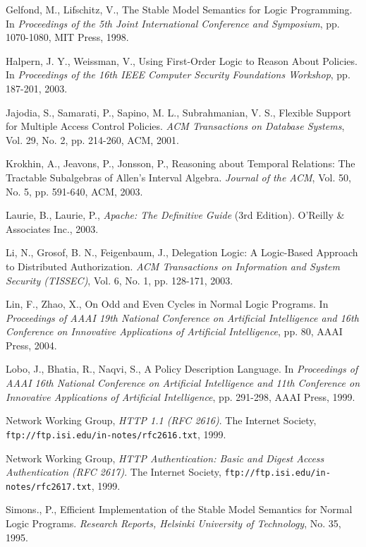 \documentclass[glov2,twocolumn,final]{svjour2}
\begin{document}
\begin{thebibliography}{5}
      Gelfond, M., Lifschitz, V.,
      The Stable Model Semantics for Logic Programming.
      In {\em Proceedings of the 5th Joint International Conference and
      Symposium},
      pp. 1070-1080, MIT Press, 1998.

      Halpern, J. Y., Weissman, V.,
      Using First-Order Logic to Reason About Policies.
      In {\em Proceedings of the 16th IEEE Computer Security Foundations
      Workshop}, pp. 187-201, 2003.

      Jajodia, S., Samarati, P., Sapino, M. L., Subrahmanian, V. S.,
      Flexible Support for Multiple Access Control Policies.
      {\em ACM Transactions on Database Systems},
      Vol. 29, No. 2, pp. 214-260, ACM, 2001.

      Krokhin, A., Jeavons, P., Jonsson, P.,
      Reasoning about Temporal Relations: The Tractable Subalgebras of
      Allen's Interval Algebra.
      {\em Journal of the ACM},
      Vol. 50, No. 5, pp. 591-640, ACM, 2003.

      Laurie, B., Laurie, P.,
      {\em Apache: The Definitive Guide} (3rd Edition).
      O'Reilly \& Associates Inc., 2003.

      Li, N., Grosof, B. N., Feigenbaum, J.,
      Delegation Logic: A Logic-Based Approach to Distributed Authorization.
      {\em ACM Transactions on Information and System Security (TISSEC)},
      Vol. 6, No. 1, pp. 128-171, 2003.

      Lin, F., Zhao, X.,
      On Odd and Even Cycles in Normal Logic Programs.
      In {\em Proceedings of AAAI 19th National Conference on Artificial
      Intelligence and 16th Conference on Innovative Applications of Artificial
      Intelligence},
      pp. 80, AAAI Press, 2004.

      Lobo, J., Bhatia, R., Naqvi, S.,
      A Policy Description Language.
      In {\em Proceedings of AAAI 16th National Conference on Artificial
      Intelligence and 11th Conference on Innovative Applications of Artificial
      Intelligence},
      pp. 291-298, AAAI Press, 1999.

      Network Working Group,
      {\em HTTP 1.1 (RFC 2616)}.
      The Internet Society,
      {\tt \scriptsize ftp://ftp.isi.edu/in-notes/rfc2616.txt},
      1999.

      Network Working Group,
      {\em HTTP Authentication: Basic and Digest Access Authentication (RFC 2617)}.
      The Internet Society,
      {\tt \scriptsize ftp://ftp.isi.edu/in-notes/rfc2617.txt},
      1999.

      Simons., P.,
      Efficient Implementation of the Stable Model Semantics for Normal Logic
      Programs.
      {\em Research Reports, Helsinki University of Technology},
      No. 35, 1995.
  \end{thebibliography}
\end{document}

